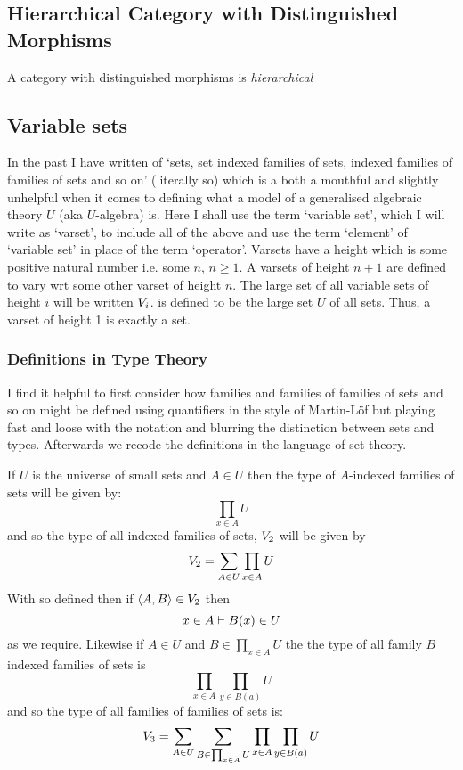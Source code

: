 \documentclass[10pt,a4paper]{scrartcl}
\begin{document}
\subsection{Hierarchical Category with Distinguished Morphisms}
A category with distinguished morphisms is \textit{hierarchical} 


\subsection{Variable sets}
\noindent In the past I have written of `sets, 
set indexed families of sets, indexed families of families of sets and so on' (literally so) which is  a both a mouthful and slightly unhelpful when it comes to
defining what a model of a generalised algebraic theory $U$ (aka $U$-algebra) is.
\noindent
Here I shall use the term `variable set', which I will write as `varset', to include all of the above and use the term `element'  of `variable set' in place of the term `operator'.
\noindent
Varsets have a height which is some positive natural number i.e. some $n$, $n \geq 1$. A varsets of height $n+1$ are defined to vary wrt some other varset of height $n$. The large set of all variable sets of height $i$ will be written $\varset[i]$.
\varset[1] is defined to be the large set $U$ of all sets. Thus, a varset of height 1 is exactly a set. 

\subsubsection{Definitions in Type Theory}
I find it helpful to first consider how families and families of families of sets and so on might be defined using quantifiers in the style of Martin-L\"of but playing fast and loose with the notation and blurring the distinction between sets and types. Afterwards we recode the definitions in the language of set theory. 

\noindent
If $U$ is the universe of small sets  and $A \in U$ then the type 
of $A$-indexed families of sets will be given by:
\begin{equation*}
\prod_{x \in A}U
\end{equation*}
and so the type of all indexed families of sets, $\varset[2]$ will be given by
\begin{equation*}
\varset[2]=\sum_{A \in U}\prod_{x \in A}U
\end{equation*}
With \varset[2] so defined then if $\tuple{A,B} \in \varset[2]$ then
\begin{equation*}
x \in A \tstyle B(x) \in U 
\end{equation*}
as we require.
\noindent
Likewise if  $A \in U$ and $B \in \prod_{x \in A}U$ the the type of all
family $B$ indexed families of sets is
\begin{equation*}
\prod_{x \in A}\prod_{y \in B(a)}U
\end{equation*}
and so the type of all families of families of sets is:
\begin{equation*}
\varset[3]=\sum_{A \in U}\sum_{B \in \prod_{x \in A}U} \prod_{x \in A}\prod_{y \in B(a)}U
\end{equation*}
\end{document}
